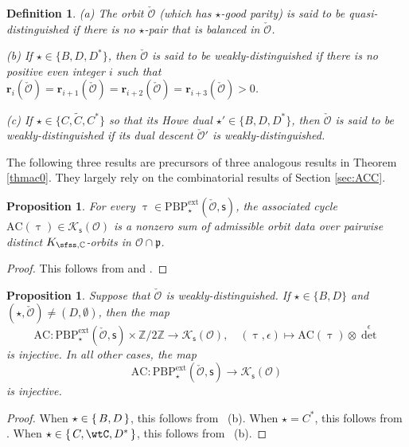 \documentclass[12pt,a4paper]{amsart}
\newcommand{\CK}{{\mathcal {K}}}
\newcommand{\CO}{{\mathcal {O}}}
\newcommand{\p}{\mathfrak p}
\newcommand{\Z}{\mathbb{Z}}
\numberwithin{equation}{section}
\newtheorem{prop}[thm]{Proposition}
\newtheorem{defn}[thm]{Definition}
\theoremstyle{remark}
\def\PBPe{\mathrm{PBP}^{\mathrm{ext}}}
\begin{document}
\begin{defn}
\noindent
(a) The orbit $\check \CO$ (which has $\star$-good parity) is said to be quasi-distinguished if there is no $\star$-pair that is balanced in $\check \CO$.

\noindent
(b) If  $\star\in \{B, D, D^*\}$, then $\check \CO$ is said to be weakly-distinguished if there is no positive even integer $i$ such that $\mathbf{r}_i(\check \CO)=\mathbf{r}_{i+1}(\check \CO)= \mathbf{r}_{i+2}(\check \CO)=\mathbf{r}_{i+3}(\check \CO)>0$.


\noindent
(c) If  $\star\in \{C, \widetilde C, C^*\}$ so that its Howe dual $\star'\in  \{B, D, D^*\}$, then $\check \CO$ is said to be weakly-distinguished if its dual descent $\check \CO'$
is weakly-distinguished.

\end{defn}

The following three results are precursors of three analogous results in Theorem \ref{thmac0}. They largely rely on the combinatorial results of
Section \ref{sec:ACC}.

\begin{prop}\label{thmac1}
 For every $\uptau\in \PBPe_\star(\check \CO,\mathsf s)$, the associated cycle $\mathrm{AC}(\uptau)\in \CK_{\mathsf s}(\CO)$ is a nonzero  sum of  admissible orbit data
over pairwise distinct $K_{\sfss,\C}$-orbits in $\CO\cap \p$.
\end{prop}

\begin{proof}
  This follows from  and .
\end{proof}


\begin{prop}\label{thmac2}
Suppose that  $\check \CO$ is weakly-distinguished.  If $\star\in \{B,D\}$ and $(\star, \check \CO)\neq (D, \emptyset)$, then  the map
\[
\mathrm{AC}: \PBPe_\star(\check \CO,\mathsf s)\times \Z/2\Z \rightarrow  \CK_{\mathsf s}(\CO),\quad (\uptau, \epsilon)\mapsto \mathrm{AC}(\uptau)\otimes {\det}^{\epsilon}
\]
is injective. In all other cases, the
map
\[
\mathrm{AC}: \PBPe_\star(\check \CO,\mathsf s)\rightarrow  \CK_{\mathsf s}(\CO)
\]
is injective.
\end{prop}
\begin{proof}
When $\star\in \set{B,D}$, this follows from ~(b).
When $\star = C^{*}$, this follows from .
When $\star\in \set{C,\wtC,D^{*}}$, this follows from ~(b).
\end{proof}
\end{document}
